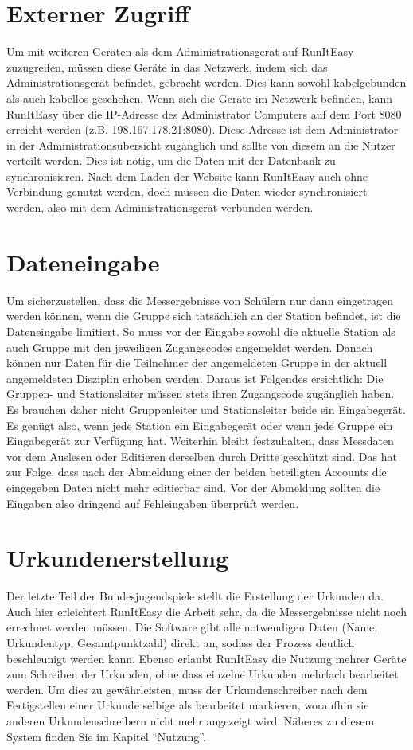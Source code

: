 \documentclass[11pt,a4paper,titlepage,german]{article}
\begin{document}
		\section{Externer Zugriff}
			Um mit weiteren Geräten als dem Administrationsgerät auf RunItEasy zuzugreifen, müssen diese Geräte in das Netzwerk, indem sich das Administrationsgerät befindet, gebracht werden. Dies kann sowohl kabelgebunden als auch kabellos geschehen. Wenn sich die Geräte im Netzwerk befinden, kann RunItEasy über die IP-Adresse des Administrator Computers auf dem Port 8080 erreicht werden (z.B. 198.167.178.21:8080). Diese Adresse ist dem Administrator in der Administrationsübersicht zugänglich und sollte von diesem an die Nutzer verteilt werden. Dies ist nötig, um die Daten mit der Datenbank zu synchronisieren. Nach dem Laden der Website kann RunItEasy auch ohne Verbindung genutzt werden, doch müssen die Daten wieder synchronisiert werden, also mit dem Administrationsgerät verbunden werden.
			
		\section{Dateneingabe}
			Um sicherzustellen, dass die Messergebnisse von Schülern nur dann eingetragen werden können, wenn die Gruppe sich tatsächlich an der Station befindet, ist die Dateneingabe limitiert. So muss vor der Eingabe sowohl die aktuelle Station als auch Gruppe mit den jeweiligen Zugangscodes angemeldet werden. Danach können nur Daten für die Teilnehmer der angemeldeten Gruppe in der aktuell angemeldeten Disziplin erhoben werden. Daraus ist Folgendes ersichtlich:
			Die Gruppen- und Stationsleiter müssen stets ihren Zugangscode zugänglich haben. Es brauchen daher nicht Gruppenleiter und Stationsleiter beide ein Eingabegerät. Es genügt also, wenn jede Station ein Eingabegerät oder wenn jede Gruppe ein Eingabegerät zur Verfügung hat.
			Weiterhin bleibt festzuhalten, dass Messdaten vor dem Auslesen oder Editieren derselben durch Dritte geschützt sind. Das hat zur Folge, dass nach der Abmeldung einer der beiden beteiligten Accounts die eingegeben Daten nicht mehr editierbar sind. Vor der Abmeldung sollten die Eingaben also dringend auf Fehleingaben überprüft werden.
			
		\section{Urkundenerstellung}
			Der letzte Teil der Bundesjugendspiele stellt die Erstellung der Urkunden da. Auch hier erleichtert RunItEasy die Arbeit sehr, da die Messergebnisse nicht noch errechnet werden müssen. Die Software gibt alle notwendigen Daten (Name, Urkundentyp, Gesamtpunktzahl) direkt an, sodass der Prozess deutlich beschleunigt werden kann.
			Ebenso erlaubt RunItEasy die Nutzung mehrer Geräte zum Schreiben der Urkunden, ohne dass einzelne Urkunden mehrfach bearbeitet werden. Um dies zu gewährleisten, muss der Urkundenschreiber nach dem Fertigstellen einer Urkunde selbige als bearbeitet markieren, woraufhin sie anderen Urkundenschreibern nicht mehr angezeigt wird. Näheres zu diesem System finden Sie im Kapitel “Nutzung”.
		
\end{document}
